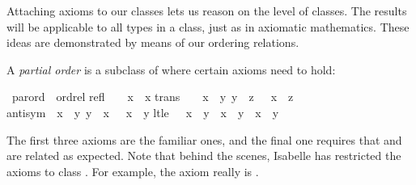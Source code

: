 %
\begin{isabellebody}%
\def\isabellecontext{Axioms}%
%
\isadelimtheory
%
\endisadelimtheory
%
\isatagtheory
%
\endisatagtheory
{\isafoldtheory}%
%
\isadelimtheory
%
\endisadelimtheory
%
\isamarkuptrue%
%
\begin{isamarkuptext}%
Attaching axioms to our classes lets us reason on the
level of classes.  The results will be applicable to all types in a class,
just as in axiomatic mathematics.  These ideas are demonstrated by means of
our ordering relations.%
\end{isamarkuptext}%
\isamarkuptrue%
%
\isamarkuptrue%
%
\begin{isamarkuptext}%
A \emph{partial order} is a subclass of 
where certain axioms need to hold:%
\end{isamarkuptext}%
\isamarkuptrue%
\isamarkupfalse%
\ parord\ {\isacharless}\ ordrel\isanewline
refl{\isacharcolon}\ \ \ \ {\isachardoublequoteopen}x\ {\isacharless}{\isacharless}{\isacharequal}\ x{\isachardoublequoteclose}\isanewline
trans{\isacharcolon}\ \ \ {\isachardoublequoteopen}{\isasymlbrakk}\ x\ {\isacharless}{\isacharless}{\isacharequal}\ y{\isacharsemicolon}\ y\ {\isacharless}{\isacharless}{\isacharequal}\ z\ {\isasymrbrakk}\ {\isasymLongrightarrow}\ x\ {\isacharless}{\isacharless}{\isacharequal}\ z{\isachardoublequoteclose}\isanewline
antisym{\isacharcolon}\ {\isachardoublequoteopen}{\isasymlbrakk}\ x\ {\isacharless}{\isacharless}{\isacharequal}\ y{\isacharsemicolon}\ y\ {\isacharless}{\isacharless}{\isacharequal}\ x\ {\isasymrbrakk}\ {\isasymLongrightarrow}\ x\ {\isacharequal}\ y{\isachardoublequoteclose}\isanewline
lt{\isacharunderscore}le{\isacharcolon}\ \ \ {\isachardoublequoteopen}x\ {\isacharless}{\isacharless}\ y\ {\isacharequal}\ {\isacharparenleft}x\ {\isacharless}{\isacharless}{\isacharequal}\ y\ {\isasymand}\ x\ {\isasymnoteq}\ y{\isacharparenright}{\isachardoublequoteclose}%
\begin{isamarkuptext}%
\noindent
The first three axioms are the familiar ones, and the final one
requires that \isa{{\isacharless}{\isacharless}} and \isa{{\isacharless}{\isacharless}{\isacharequal}} are related as expected.
Note that behind the scenes, Isabelle has restricted the axioms to class
. For example, the axiom  really is
.


\end{isamarkuptext}
\end{isabellebody}
